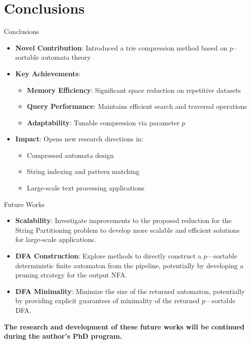 \documentclass[aspectratio=169]{beamer}
\begin{document}
\section{Conclusions}
\begin{frame}{Conclusions}
	\begin{itemize}
		\item \textcolor{oiRed}{\textbf{Novel Contribution}:} Introduced a trie compression method based on $p$--sortable automata theory
		\item \textcolor{oiBlue}{\textbf{Key Achievements}:}
		      \begin{itemize}
			      \item \textbf{Memory Efficiency}: Significant space reduction on repetitive datasets
			      \item \textbf{Query Performance}: Maintains efficient search and traversal operations
			      \item \textbf{Adaptability}: Tunable compression via parameter $p$
		      \end{itemize}
		\item \textcolor{oiOrange}{\textbf{Impact}:} Opens new research directions in:
		      \begin{itemize}
			      \item Compressed automata design
			      \item String indexing and pattern matching
			      \item Large-scale text processing applications
		      \end{itemize}
	\end{itemize}
\end{frame}

\begin{frame}{Future Works}
	\begin{itemize}
		\item \textcolor{oiRed}{\textbf{Scalability}:} Investigate improvements to the proposed reduction for the String Partitioning problem to develop more scalable and efficient solutions for large-scale applications.
		\item \textcolor{oiBlue}{\textbf{DFA Construction}:} Explore methods to directly construct a $p$—sortable deterministic finite automaton from the pipeline, potentially by developing a pruning strategy for the output NFA.
		\item \textcolor{oiOrange}{\textbf{DFA Minimality}:} Minimize the size of the returned automaton, potentially by providing explicit guarantees of minimality of the returned $p$—sortable DFA.
	\end{itemize}

	\vspace{1cm}
	\textbf{The research and development of these future works will be continued during the author's PhD program.}
\end{frame}
\end{document}
